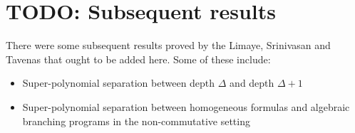 \section{TODO: Subsequent results}

There were some subsequent results proved by the Limaye, Srinivasan and Tavenas that ought to be added here. Some of these include:
\begin{itemize}\itemsep0pt
\item Super-polynomial separation between depth $\Delta$ and depth $\Delta+1$
\item Super-polynomial separation between homogeneous formulas and algebraic branching programs in the non-commutative setting
\end{itemize}





